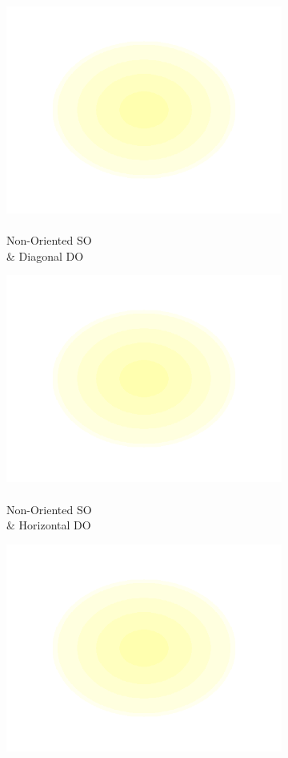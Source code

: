 \documentclass[journal,onecolumn]{IEEEtran}
\begin{document}
\begin{figure}[h]
\begin{subfigure}[b]{0.2\textwidth}
            \includegraphics[width=.85\linewidth]{j_4_2}
            \caption{\\ Non-Oriented SO \\ \& Diagonal DO}
    \end{subfigure}%
    \begin{subfigure}[b]{0.2\textwidth}
            \centering
            \captionsetup{justification=centering}
            \includegraphics[width=.85\linewidth]{j_4_3}
            \caption{\\ Non-Oriented SO \\ \& Horizontal DO}
    \end{subfigure}
    \begin{subfigure}[b]{0.2\textwidth}
            \centering
            \captionsetup{justification=centering}
            \includegraphics[width=.85\linewidth]{j_4_4}

\end{subfigure}
\end{figure}
\end{document}
